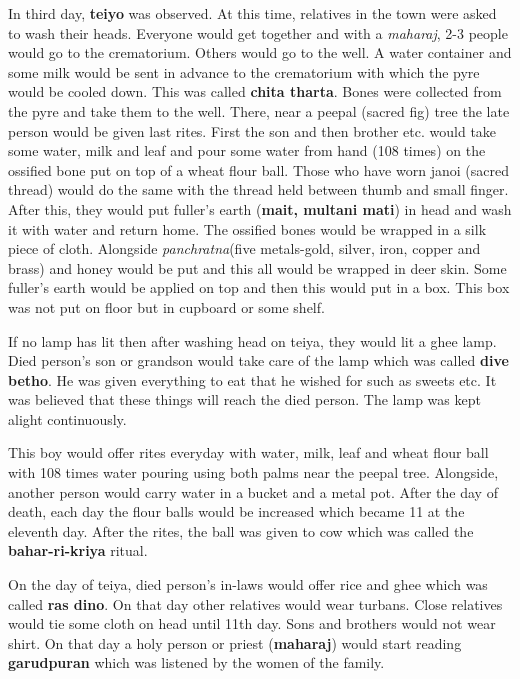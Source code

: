 In third day, \textbf{teiyo} was observed. At this time, relatives in the town
were asked to wash their heads. Everyone would get together and with a
\textit{maharaj}, 2-3 people would go to the crematorium. Others would go to
the well. A water container and some milk would be sent in advance to the
crematorium with which the pyre would be cooled down. This was called
\textbf{chita tharta}. Bones were collected from the pyre and take them to the
well. There, near a peepal (sacred fig) tree the late person would be given
last rites. First the son and then brother etc. would take some water, milk and
leaf and pour some water from hand (108 times) on the ossified bone put on top
of a wheat flour ball. Those who have worn janoi (sacred thread) would do the
same with the thread held between thumb and small finger. After this, they
would put fuller's earth (\textbf{mait, multani mati}) in head and wash it with
water and return home. The ossified bones would be wrapped in a silk piece of
cloth. Alongside \textit{panchratna}(five metals-gold, silver, iron, copper and
brass) and honey would be put and this all would be wrapped in deer skin. Some
fuller's earth would be applied on top and then this would put in a box. This
box was not put on floor but in cupboard or some shelf.

If no lamp has lit then after washing head on teiya, they would lit a ghee
lamp. Died person's son or grandson would take care of the lamp which was
called \textbf{dive betho}. He was given everything to eat that he wished for
such as sweets etc. It was believed that these things will reach the died
person. The lamp was kept alight continuously. 

This boy would offer rites everyday with water, milk, leaf and wheat flour ball
with 108 times water pouring using both palms near the peepal tree. Alongside,
another person would carry water in a bucket and a metal pot. After the day of
death, each day the flour balls would be increased which became 11 at the
eleventh day. After the rites, the ball was given to cow which was called the
\textbf{bahar-ri-kriya} ritual.

On the day of teiya, died person's in-laws would offer rice and ghee which was
called \textbf{ras dino}. On that day other relatives would wear turbans. Close
relatives would tie some cloth on head until 11th day. Sons and brothers would
not wear shirt. On that day a holy person or priest (\textbf{maharaj}) would
start reading \textbf{garudpuran} which was listened by the women of the
family. 

